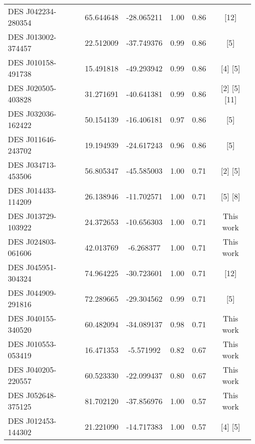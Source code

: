 \documentclass[tradiabstract,twocolumn]{aa}
\begin{document}
{\begin{longtable}{lccccc}
 DES J042234-280354 &   65.644648 & -28.065211 &      1.00 &                    0.86 &                           [12] \\
 DES J013002-374457 &   22.512009 & -37.749376 &      0.99 &                    0.86 &                            [5] \\
 DES J010158-491738 &   15.491818 & -49.293942 &      0.99 &                    0.86 &                       [4]  [5] \\
 DES J020505-403828 &   31.271691 & -40.641381 &      0.99 &                    0.86 &                 [2]  [5]  [11] \\
 DES J032036-162422 &   50.154139 & -16.406181 &      0.97 &                    0.86 &                            [5] \\
 DES J011646-243702 &   19.194939 & -24.617243 &      0.96 &                    0.86 &                            [5] \\
 DES J034713-453506 &   56.805347 & -45.585003 &      1.00 &                    0.71 &                       [2]  [5] \\
 DES J014433-114209 &   26.138946 & -11.702571 &      1.00 &                    0.71 &                       [5]  [8] \\
 DES J013729-103922 &   24.372653 & -10.656303 &      1.00 &                    0.71 &                      This work \\
 DES J024803-061606 &   42.013769 &  -6.268377 &      1.00 &                    0.71 &                      This work \\
 DES J045951-304324 &   74.964225 & -30.723601 &      1.00 &                    0.71 &                           [12] \\
 DES J044909-291816 &   72.289665 & -29.304562 &      0.99 &                    0.71 &                            [5] \\
 DES J040155-340520 &   60.482094 & -34.089137 &      0.98 &                    0.71 &                      This work \\
 DES J010553-053419 &   16.471353 &  -5.571992 &      0.82 &                    0.67 &                      This work \\
 DES J040205-220557 &   60.523330 & -22.099437 &      0.80 &                    0.67 &                      This work \\
 DES J052648-375125 &   81.702120 & -37.856976 &      1.00 &                    0.57 &                      This work \\
 DES J012453-144302 &   21.221090 & -14.717383 &      1.00 &                    0.57 &                       [4]  [5] \\

\end{longtable}}
\end{document}
